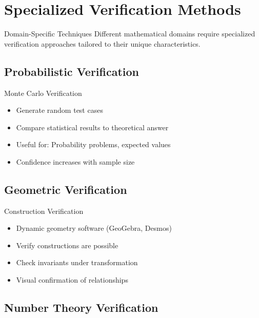 \documentclass{article}
\begin{document}
\newpage

\section{Specialized Verification Methods}

\begin{specializedbox}{Domain-Specific Techniques}
Different mathematical domains require specialized verification approaches tailored to their unique characteristics.
\end{specializedbox}

\subsection{Probabilistic Verification}

\begin{specializedbox}{Monte Carlo Verification}
\begin{itemize}
\item Generate random test cases
\item Compare statistical results to theoretical answer
\item Useful for: Probability problems, expected values
\item Confidence increases with sample size
\end{itemize}
\end{specializedbox}

\subsection{Geometric Verification}

\begin{specializedbox}{Construction Verification}
\begin{itemize}
\item Dynamic geometry software (GeoGebra, Desmos)
\item Verify constructions are possible
\item Check invariants under transformation
\item Visual confirmation of relationships
\end{itemize}
\end{specializedbox}

\subsection{Number Theory Verification}
\end{document}
